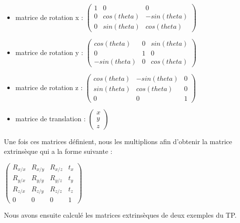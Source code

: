 \documentclass[a4paper,11pt]{article}
\begin{document}
  \begin{itemize}
   \item matrice de rotation x : 
   $\begin{pmatrix}
     1 & 0 & 0\\
     0 & cos(theta) & -sin(theta)\\
     0 & sin(theta) & cos(theta)
    \end{pmatrix}$
    
   \item matrice de rotation y : 
   $\begin{pmatrix}
     cos(theta) & 0 & sin(theta)\\
     0 & 1 & 0\\
     -sin(theta) & 0 & cos(theta)
    \end{pmatrix}$
    
   \item matrice de rotation z : 
   $\begin{pmatrix}
     cos(theta) & -sin(theta) & 0\\
     sin(theta) & cos(theta) & 0\\
     0 & 0 & 1
    \end{pmatrix}$
    
   \item matrice de translation : 
   $\begin{pmatrix}
     x\\
     y\\
     z
    \end{pmatrix}$

  \end{itemize}
  
  Une fois ces matrices définient, nous les multiplions afin d'obtenir la matrice
  extrinsèque qui a la forme suivante :\\
  \begin{center}
    $\begin{pmatrix}
      R_{x/x} & R_{x/y} & R_{x/z} & t_{x}\\
      R_{y/x} & R_{y/y} & R_{y/z} & t_{y}\\
      R_{z/x} & R_{z/y} & R_{z/z} & t_{z}\\
      0 & 0 & 0 & 1
      \end{pmatrix}$
  \end{center}
  
  Nous avons ensuite calculé les matrices extrinsèques de deux exemples du TP.\\
  
\end{document}
